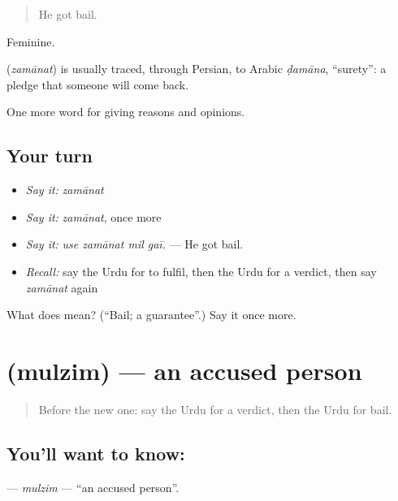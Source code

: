 \begin{quote}
He got bail.
\end{quote}

Feminine.

\begin{cousinweb}
\textbf{} (\emph{zamānat}) is usually traced, through Persian, to Arabic \emph{ḍamāna}, \textquotedblleft{}surety\textquotedblright{}: a pledge that someone will come back.
\end{cousinweb}

\begin{grammarlens}[title={What you've built}]
One more word for giving reasons and opinions.
\end{grammarlens}

\subsection*{Your turn}
\begin{itemize}
\raggedright
  \item \emph{Say it:} \emph{zamānat}
  \item \emph{Say it:} \emph{zamānat}, once more
  \item \emph{Say it:} \emph{use zamānat mil gaī.} — He got bail.
  \item \emph{Recall:} say the Urdu for to fulfil, then the Urdu for a verdict, then say \emph{zamānat} again
\end{itemize}

\begin{tcolorbox}[breakable,colback=teal!4,colframe=teal!35!black,title={Before you move on}]
What does  mean? (\textquotedblleft{}Bail; a guarantee\textquotedblright{}.) Say it once more.
\end{tcolorbox}
\section[\texorpdfstring{\ur{ملزم} (mulzim)}{ملزم (mulzim)}]{ (mulzim) — an accused person}

\label{lesson:UR-C340-mulzim}



\begin{quote}
Before the new one: say the Urdu for a verdict, then the Urdu for bail.
\end{quote}

\subsection*{You'll want to know: }
\textbf{} — \emph{mulzim} — \textquotedblleft{}an accused person\textquotedblright{}.

